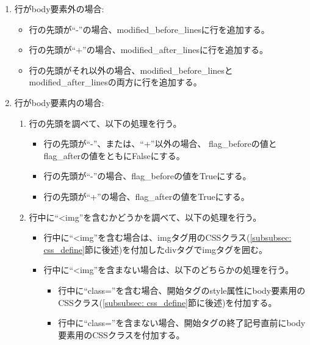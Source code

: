 \begin{enumerate}
    \item 行がbody要素外の場合:
          \begin{itemize}
              \item 行の先頭が“-”の場合、modified\_before\_linesに行を追加する。
              \item 行の先頭が“+”の場合、modified\_after\_linesに行を追加する。
              \item 行の先頭がそれ以外の場合、modified\_before\_linesとmodified\_after\_linesの両方に行を追加する。
          \end{itemize}
    \item 行がbody要素内の場合:
          \begin{enumerate}
              \item 行の先頭を調べて、以下の処理を行う。
                    \begin{itemize}
                        \item 行の先頭が“-”、または、“+”以外の場合、
                              flag\_beforeの値とflag\_afterの値をともにFalseにする。
                        \item 行の先頭が“-”の場合、flag\_beforeの値をTrueにする。
                        \item 行の先頭が“+”の場合、flag\_afterの値をTrueにする。
                    \end{itemize}
              \item 行中に“\textless img”を含むかどうかを調べて、以下の処理を行う。
                    \begin{itemize}
                        \item 行中に“\textless img”を含む場合は、imgタグ用のCSSクラス(\ref{subsubsec: css_define}節に後述)を付加したdivタグでimgタグを囲む。
                        \item 行中に“\textless img”を含まない場合は、以下のどちらかの処理を行う。
                              \begin{itemize}
                                  \item 行中に“class=”を含む場合、開始タグのstyle属性にbody要素用のCSSクラス(\ref{subsubsec: css_define}節に後述)を付加する。
                                  \item 行中に“class=”を含まない場合、開始タグの終了記号直前にbody要素用のCSSクラスを付加する。
                              \end{itemize}
                    \end{itemize}

\end{enumerate}
\end{enumerate}
